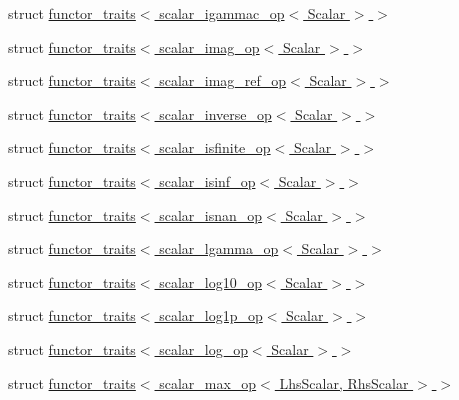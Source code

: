 \begin{DoxyCompactItemize}
\item 
struct \hyperlink{struct_eigen_1_1internal_1_1functor__traits_3_01scalar__igammac__op_3_01_scalar_01_4_01_4}{functor\+\_\+traits$<$ scalar\+\_\+igammac\+\_\+op$<$ Scalar $>$ $>$}
\item 
struct \hyperlink{struct_eigen_1_1internal_1_1functor__traits_3_01scalar__imag__op_3_01_scalar_01_4_01_4}{functor\+\_\+traits$<$ scalar\+\_\+imag\+\_\+op$<$ Scalar $>$ $>$}
\item 
struct \hyperlink{struct_eigen_1_1internal_1_1functor__traits_3_01scalar__imag__ref__op_3_01_scalar_01_4_01_4}{functor\+\_\+traits$<$ scalar\+\_\+imag\+\_\+ref\+\_\+op$<$ Scalar $>$ $>$}
\item 
struct \hyperlink{struct_eigen_1_1internal_1_1functor__traits_3_01scalar__inverse__op_3_01_scalar_01_4_01_4}{functor\+\_\+traits$<$ scalar\+\_\+inverse\+\_\+op$<$ Scalar $>$ $>$}
\item 
struct \hyperlink{struct_eigen_1_1internal_1_1functor__traits_3_01scalar__isfinite__op_3_01_scalar_01_4_01_4}{functor\+\_\+traits$<$ scalar\+\_\+isfinite\+\_\+op$<$ Scalar $>$ $>$}
\item 
struct \hyperlink{struct_eigen_1_1internal_1_1functor__traits_3_01scalar__isinf__op_3_01_scalar_01_4_01_4}{functor\+\_\+traits$<$ scalar\+\_\+isinf\+\_\+op$<$ Scalar $>$ $>$}
\item 
struct \hyperlink{struct_eigen_1_1internal_1_1functor__traits_3_01scalar__isnan__op_3_01_scalar_01_4_01_4}{functor\+\_\+traits$<$ scalar\+\_\+isnan\+\_\+op$<$ Scalar $>$ $>$}
\item 
struct \hyperlink{struct_eigen_1_1internal_1_1functor__traits_3_01scalar__lgamma__op_3_01_scalar_01_4_01_4}{functor\+\_\+traits$<$ scalar\+\_\+lgamma\+\_\+op$<$ Scalar $>$ $>$}
\item 
struct \hyperlink{struct_eigen_1_1internal_1_1functor__traits_3_01scalar__log10__op_3_01_scalar_01_4_01_4}{functor\+\_\+traits$<$ scalar\+\_\+log10\+\_\+op$<$ Scalar $>$ $>$}
\item 
struct \hyperlink{struct_eigen_1_1internal_1_1functor__traits_3_01scalar__log1p__op_3_01_scalar_01_4_01_4}{functor\+\_\+traits$<$ scalar\+\_\+log1p\+\_\+op$<$ Scalar $>$ $>$}
\item 
struct \hyperlink{struct_eigen_1_1internal_1_1functor__traits_3_01scalar__log__op_3_01_scalar_01_4_01_4}{functor\+\_\+traits$<$ scalar\+\_\+log\+\_\+op$<$ Scalar $>$ $>$}
\item 
struct \hyperlink{struct_eigen_1_1internal_1_1functor__traits_3_01scalar__max__op_3_01_lhs_scalar_00_01_rhs_scalar_01_4_01_4}{functor\+\_\+traits$<$ scalar\+\_\+max\+\_\+op$<$ Lhs\+Scalar, Rhs\+Scalar $>$ $>$}

\end{DoxyCompactItemize}
